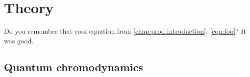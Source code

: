 \chapter{Theory}
\label{chap:prod:theory}

Do you remember that cool equation from \cref{chap:prod:introduction}, 
\cref{eqn:foo}?
It was good.

\lipsum[1-12]

\section{Quantum chromodynamics}
\label{sec:prod:qcd}

\lipsum[1-4]
